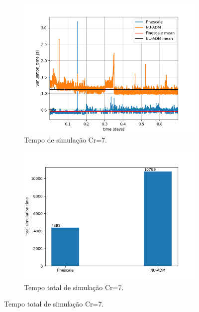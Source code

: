 \documentclass[professionalfont]{beamer}
\begin{document}
\begin{frame}{\FrameProblemName}
    \begin{figure}[!htbp]
        \centering
        \caption{Tempos de simulação}
        \begin{subfigure}{.48\textwidth}
            \centering
            \includegraphics[scale=0.4]{./imgs/pr4/tempo_sim_cr7.png}
            \caption{Tempo de simulação Cr=7.}
        \end{subfigure}
        \hfill
        \begin{subfigure}{.48\textwidth}
            \centering
            \includegraphics[scale=0.4]{./imgs/pr4/total_time_cr7.png}
            \caption{Tempo total de simulação Cr=7.}
        \end{subfigure}

\end{figure}
\end{frame}
\end{document}
